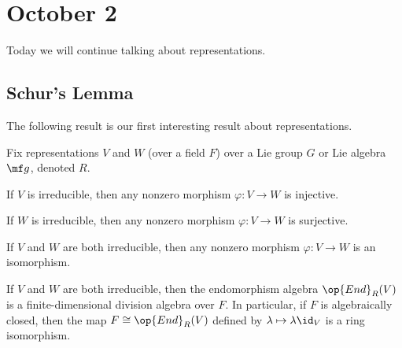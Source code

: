 \documentclass[../notes.tex]{subfiles}
\begin{document}
\section{October 2}
Today we will continue talking about representations.

\subsection{Schur's Lemma}
The following result is our first interesting result about representations.
\begin{proposition} \label{prop:schur-lemma}
	Fix representations $V$ and $W$ (over a field $F$) over a Lie group $G$ or Lie algebra $\mf g$, denoted $R$.
	\begin{listalph}
		\item If $V$ is irreducible, then any nonzero morphism $\varphi\colon V\to W$ is injective.
		\item If $W$ is irreducible, then any nonzero morphism $\varphi\colon V\to W$ is surjective.
		\item If $V$ and $W$ are both irreducible, then any nonzero morphism $\varphi\colon V\to W$ is an isomorphism.
		\item If $V$ and $W$ are both irreducible, then the endomorphism algebra $\op{End}_R(V)$ is a finite-dimensional division algebra over $F$. In particular, if $F$ is algebraically closed, then the map $F\cong\op{End}_R(V)$ defined by $\lambda\mapsto\lambda\id_V$ is a ring isomorphism.
	\end{listalph}
\end{proposition}
\end{document}
